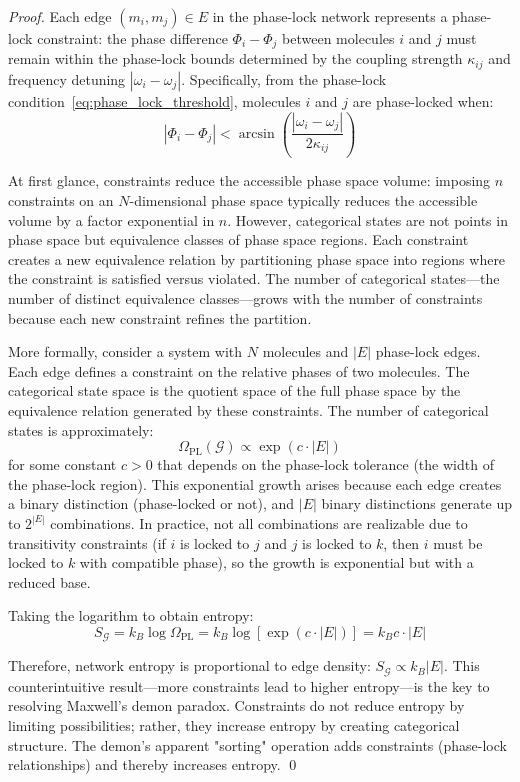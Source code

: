 \documentclass[12pt,a4paper]{article}
\theoremstyle{definition}
\theoremstyle{remark}
\newcommand{\phaselockgraph}{\mathcal{G}}
\begin{document}
\begin{proof}
Each edge $(m_i, m_j) \in E$ in the phase-lock network represents a phase-lock constraint: the phase difference $\Phi_i - \Phi_j$ between molecules $i$ and $j$ must remain within the phase-lock bounds determined by the coupling strength $\kappa_{ij}$ and frequency detuning $|\omega_i - \omega_j|$. Specifically, from the phase-lock condition~\eqref{eq:phase_lock_threshold}, molecules $i$ and $j$ are phase-locked when:
\begin{equation}
|\Phi_i - \Phi_j| < \arcsin\left(\frac{|\omega_i - \omega_j|}{2\kappa_{ij}}\right)
\end{equation}

At first glance, constraints reduce the accessible phase space volume: imposing $n$ constraints on an $N$-dimensional phase space typically reduces the accessible volume by a factor exponential in $n$. However, categorical states are not points in phase space but equivalence classes of phase space regions. Each constraint creates a new equivalence relation by partitioning phase space into regions where the constraint is satisfied versus violated. The number of categorical states—the number of distinct equivalence classes—grows with the number of constraints because each new constraint refines the partition.

More formally, consider a system with $N$ molecules and $|E|$ phase-lock edges. Each edge defines a constraint on the relative phases of two molecules. The categorical state space is the quotient space of the full phase space by the equivalence relation generated by these constraints. The number of categorical states is approximately:
\begin{equation}
\Omega_{\text{PL}}(\phaselockgraph) \propto \exp(c \cdot |E|)
\end{equation}
for some constant $c > 0$ that depends on the phase-lock tolerance (the width of the phase-lock region). This exponential growth arises because each edge creates a binary distinction (phase-locked or not), and $|E|$ binary distinctions generate up to $2^{|E|}$ combinations. In practice, not all combinations are realizable due to transitivity constraints (if $i$ is locked to $j$ and $j$ is locked to $k$, then $i$ must be locked to $k$ with compatible phase), so the growth is exponential but with a reduced base.

Taking the logarithm to obtain entropy:
\begin{equation}
S_{\phaselockgraph} = k_B \log \Omega_{\text{PL}} = k_B \log[\exp(c \cdot |E|)] = k_B c \cdot |E|
\end{equation}

Therefore, network entropy is proportional to edge density: $S_{\phaselockgraph} \propto k_B |E|$. This counterintuitive result—more constraints lead to higher entropy—is the key to resolving Maxwell's demon paradox. Constraints do not reduce entropy by limiting possibilities; rather, they increase entropy by creating categorical structure. The demon's apparent "sorting" operation adds constraints (phase-lock relationships) and thereby increases entropy. \qed
\end{proof}
\end{document}
